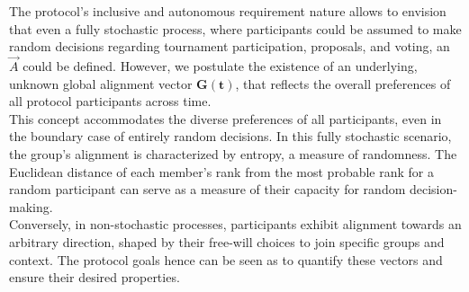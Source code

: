 \documentclass{article}
\begin{document}
\begin{CJK}{UTF8}{gbsn}
\begin{multicols}{2}
        The protocol's inclusive and autonomous requirement nature allows to envision that even a fully stochastic process, where participants could be assumed to make random decisions regarding tournament participation, proposals, and voting, an $\vec{A}$ could be defined.
        However, we postulate the existence of an underlying, unknown global alignment vector $\mathbf{G(t)}$, that reflects the overall preferences of all protocol participants across time. \\
        This concept accommodates the diverse preferences of all participants, even in the boundary case of entirely random decisions.
        In this fully stochastic scenario, the group's alignment is characterized by entropy, a measure of randomness. The Euclidean distance of each member's rank from the most probable rank for a random participant can serve as a measure of their capacity for random decision-making. \\
        Conversely, in non-stochastic processes, participants exhibit alignment towards an arbitrary direction, shaped by their free-will choices to join specific groups and context. The protocol goals hence can be seen as to quantify these vectors and ensure their desired properties.



\end{multicols}
\end{CJK}
\end{document}
